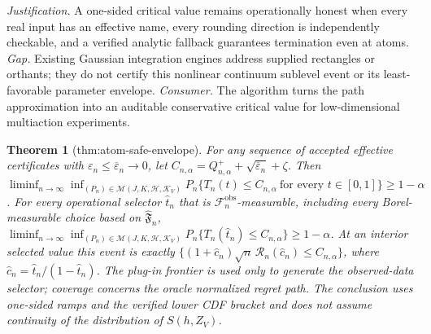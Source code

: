 \documentclass{article}
\newtheorem{theorem}{Theorem}
\begin{document}
\par\smallskip\noindent \textit{Justification.} A one-sided critical value remains operationally honest when every real input has an effective name, every rounding direction is independently checkable, and a verified analytic fallback guarantees termination even at atoms. \textit{Gap.} Existing Gaussian integration engines address supplied rectangles or orthants; they do not certify this nonlinear continuum sublevel event or its least-favorable parameter envelope. \textit{Consumer.} The algorithm turns the path approximation into an auditable conservative critical value for low-dimensional multiaction experiments.

\begin{theorem}[thm:atom-safe-envelope]\label{thm:atom-safe-envelope}
For any sequence of accepted effective certificates with \(\varepsilon_n\le\overline\varepsilon_n\to0\), let \(C_{n,\alpha}=Q^+_{n,\alpha}+\sqrt{\overline\varepsilon_n}+\zeta\). Then \(\liminf_{n\to\infty}\inf_{(P_n)\in\mathcal M(J,K,\mathcal H,\mathcal K_V)}P_n\{T_n(t)\le C_{n,\alpha}\ \text{for every }t\in[0,1]\}\ge1-\alpha\). For every operational selector \(\widehat t_n\) that is \(\mathcal F_n^{\mathrm{obs}}\)-measurable, including every Borel-measurable choice based on \(\widehat{\mathfrak F}_n\), \(\liminf_{n\to\infty}\inf_{(P_n)\in\mathcal M(J,K,\mathcal H,\mathcal K_V)}P_n\{T_n(\widehat t_n)\le C_{n,\alpha}\}\ge1-\alpha\). At an interior selected value this event is exactly \(\{(1+\widehat c_n)\sqrt n\,\mathscr R_n(\widehat c_n)\le C_{n,\alpha}\}\), where \(\widehat c_n=\widehat t_n/(1-\widehat t_n)\). The plug-in frontier is used only to generate the observed-data selector; coverage concerns the oracle normalized regret path. The conclusion uses one-sided ramps and the verified lower CDF bracket and does not assume continuity of the distribution of \(S(h,Z_V)\).
\end{theorem}
\end{document}
